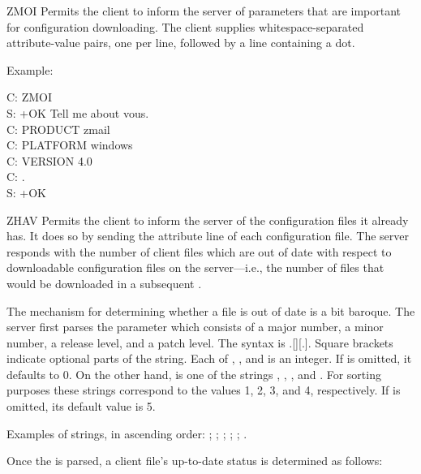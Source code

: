 \begin{codelist}
\item[ZMOI] Permits the client to inform the server of parameters that
are important for configuration downloading.  The client supplies
whitespace-separated attribute-value pairs, one per line, followed by
a line containing a dot.

Example:

\begin{conversation}
C: ZMOI \\
S: +OK Tell me about vous. \\
C: PRODUCT zmail \\
C: PLATFORM windows \\
C: VERSION 4.0 \\
C: . \\
S: +OK
\end{conversation}

\item[ZHAV] Permits the client to inform the server of the
configuration files it already has.  It does so by sending the
attribute line of each configuration file.  The server responds with
the number of client files which are out of date with respect to
downloadable configuration files on the server---i.e., the number of
files that would be downloaded in a subsequent .

The mechanism for determining whether a file is out of date is a bit
baroque.  The server first parses the  parameter
which consists of a major number, a minor number, a release level, and
a patch level.  The syntax is
.[][.].  Square brackets
indicate optional parts of the string.  Each of ,
, and  is an integer.  If  is
omitted, it defaults to 0.  On the other hand,  is one of
the strings , , , and .  For sorting
purposes these strings correspond to the values 1, 2, 3, and 4,
respectively.  If  is omitted, its default value is 5.

Examples of  strings, in ascending order:
; ; ; ; ;
.

Once the  is parsed, a client file's up-to-date
status is determined as follows:


\end{codelist}
